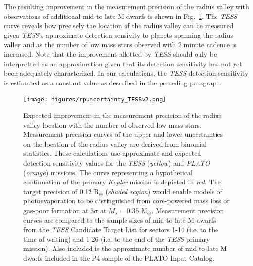 \documentclass[twocolumn]{emulateapj}
\newcommand{\kepler}[1]{\emph{Kepler}#1}
\newcommand{\tess}[1]{\emph{TESS}#1}
\newcommand{\plato}[1]{\emph{PLATO}#1}
\begin{document}
The resulting improvement in the measurement precision of the radius valley with observations of additional mid-to-late
M dwarfs is shown in Fig.~\ref{fig:improve}.
The \tess{} curve reveals how precisely the location of the radius valley can be measured given \tess{'s} approximate 
detection sensivity to planets spanning the radius valley and as the number of low mass stars observed with 2 minute
cadence is increased. Note that the improvement allotted by \tess{} should only be interpretted as an
approximation given that its detection sensitivity has not yet been adequately characterized. In our calculations, the
\tess{} detection sensitivity is estimated as a constant value as described in the preceding paragraph. 

\begin{figure}
  \centering
  \texttt{[image: figures/rpuncertainty\_TESSv2.png]}
  \caption{Expected improvement in the measurement precision of the radius valley location with the number of observed
    low mass stars. Measurement precision curves of the upper and lower uncertainties on the location of the radius valley 
    are derived from binomial statistics. These calculations use approximate and expected detection sensitivity
    values for the \tess{} (\emph{yellow}) and \plato{} (\emph{orange}) missions. The curve representing a hypothetical continuation
    of the primary \kepler{} mission is depicted in \emph{red}. The target precision of 0.12 R$_{\oplus}$ (\emph{shaded region})
    would enable models of photoevaporation to be distinguished from core-powered mass loss or gas-poor formation at $3\sigma$
    at $M_s=0.35$ M$_{\odot}$. Measurement precision curves are compared to the sample sizes of mid-to-late M dwarfs from the \tess{}
    Candidate Target List for sectors 1-14 (i.e. to the time of writing) and 1-26 (i.e. to the end of the \tess{} primary
    mission). Also included is the approximate number of mid-to-late M dwarfs included in the P4 sample of the
    PLATO Input Catalog.}
  \label{fig:improve}
\end{figure}
\end{document}
